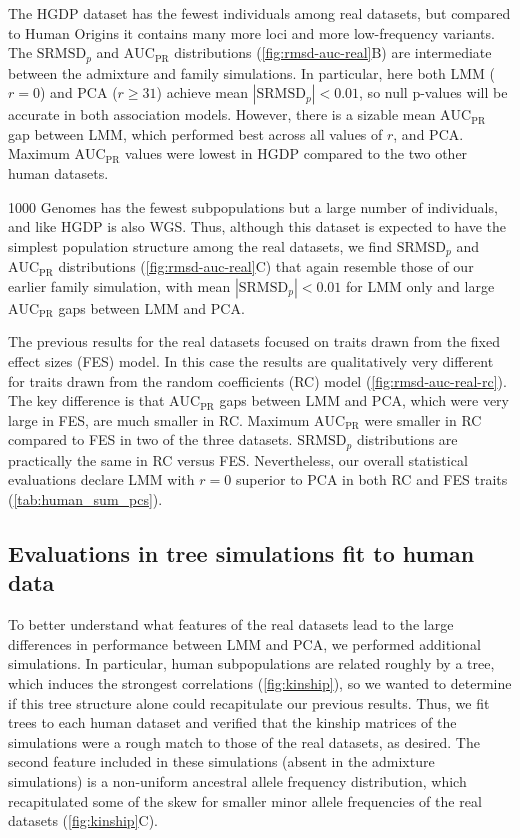 \documentclass[11pt]{article}
\newcommand{\rmsd}{\text{SRMSD}_p}
\newcommand{\auc}{\text{AUC}_\text{PR}}
\begin{document}
The HGDP dataset has the fewest individuals among real datasets, but compared to Human Origins it contains many more loci and more low-frequency variants.
The $\rmsd$ and $\auc$ distributions (\cref{fig:rmsd-auc-real}B) are intermediate between the admixture and family simulations.
In particular, here both LMM ($r=0$) and PCA ($r \ge 31$) achieve mean $|\rmsd| < 0.01$, so null p-values will be accurate in both association models.
However, there is a sizable mean $\auc$ gap between LMM, which performed best across all values of $r$, and PCA.
Maximum $\auc$ values were lowest in HGDP compared to the two other human datasets.

1000 Genomes has the fewest subpopulations but a large number of individuals, and like HGDP is also WGS.
Thus, although this dataset is expected to have the simplest population structure among the real datasets, we find $\rmsd$ and $\auc$ distributions (\cref{fig:rmsd-auc-real}C) that again resemble those of our earlier family simulation, with mean $|\rmsd| < 0.01$ for LMM only and large $\auc$ gaps between LMM and PCA.

The previous results for the real datasets focused on traits drawn from the fixed effect sizes (FES) model.
In this case the results are qualitatively very different for traits drawn from the random coefficients (RC) model (\cref{fig:rmsd-auc-real-rc}).
The key difference is that $\auc$ gaps between LMM and PCA, which were very large in FES, are much smaller in RC.
Maximum $\auc$ were smaller in RC compared to FES in two of the three datasets.
$\rmsd$ distributions are practically the same in RC versus FES.
Nevertheless, our overall statistical evaluations declare LMM with $r=0$ superior to PCA in both RC and FES traits (\cref{tab:human_sum_pcs}).

\subsection{Evaluations in tree simulations fit to human data}

To better understand what features of the real datasets lead to the large differences in performance between LMM and PCA, we performed additional simulations.
In particular, human subpopulations are related roughly by a tree, which induces the strongest correlations (\cref{fig:kinship}), so we wanted to determine if this tree structure alone could recapitulate our previous results.
Thus, we fit trees to each human dataset and verified that the kinship matrices of the simulations were a rough match to those of the real datasets, as desired.
The second feature included in these simulations (absent in the admixture simulations) is a non-uniform ancestral allele frequency distribution, which recapitulated some of the skew for smaller minor allele frequencies of the real datasets (\cref{fig:kinship}C).
\end{document}
